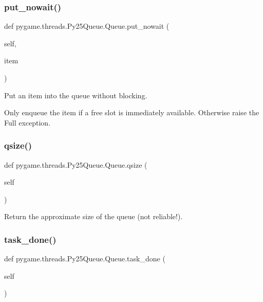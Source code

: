 \subsubsection{\texorpdfstring{put\+\_\+nowait()}{put\_nowait()}}
{\footnotesize\ttfamily def pygame.\+threads.\+Py25\+Queue.\+Queue.\+put\+\_\+nowait (\begin{DoxyParamCaption}\item[{}]{self,  }\item[{}]{item }\end{DoxyParamCaption})}

\begin{DoxyVerb}Put an item into the queue without blocking.

Only enqueue the item if a free slot is immediately available.
Otherwise raise the Full exception.
\end{DoxyVerb}
 \mbox{\label{classpygame_1_1threads_1_1_py25_queue_1_1_queue_a52b9f05689a1763988cf9d703c247528}} 
\subsubsection{\texorpdfstring{qsize()}{qsize()}}
{\footnotesize\ttfamily def pygame.\+threads.\+Py25\+Queue.\+Queue.\+qsize (\begin{DoxyParamCaption}\item[{}]{self }\end{DoxyParamCaption})}

\begin{DoxyVerb}Return the approximate size of the queue (not reliable!).\end{DoxyVerb}
 \mbox{\label{classpygame_1_1threads_1_1_py25_queue_1_1_queue_a3782c6554b781ce5bb83a9aaaa34ef88}} 
\subsubsection{\texorpdfstring{task\+\_\+done()}{task\_done()}}
{\footnotesize\ttfamily def pygame.\+threads.\+Py25\+Queue.\+Queue.\+task\+\_\+done (\begin{DoxyParamCaption}\item[{}]{self }\end{DoxyParamCaption})}


